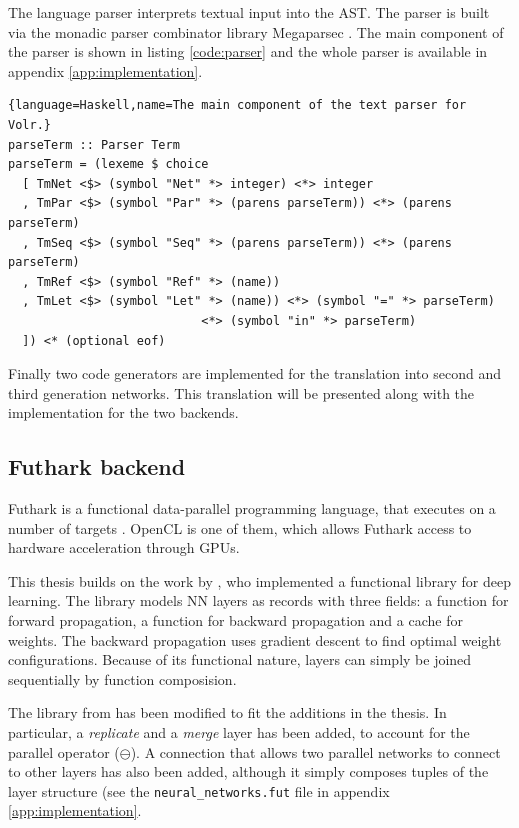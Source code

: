The language parser interprets textual input into the AST. 
The parser is built via the monadic parser combinator library Megaparsec
\cite{megaparsec}.
The main component of the parser is shown in listing \ref{code:parser}
and the whole parser is available in appendix \ref{app:implementation}.

\begin{lstlisting}{language=Haskell,name=The main component of the text parser for Volr.}
parseTerm :: Parser Term
parseTerm = (lexeme $ choice
  [ TmNet <$> (symbol "Net" *> integer) <*> integer
  , TmPar <$> (symbol "Par" *> (parens parseTerm)) <*> (parens parseTerm)
  , TmSeq <$> (symbol "Seq" *> (parens parseTerm)) <*> (parens parseTerm)
  , TmRef <$> (symbol "Ref" *> (name))
  , TmLet <$> (symbol "Let" *> (name)) <*> (symbol "=" *> parseTerm)
                           <*> (symbol "in" *> parseTerm)
  ]) <* (optional eof)
\end{lstlisting} \label{code:parser}

Finally two code generators are implemented for the translation into
second and third generation networks.
This translation will be presented along with the implementation
for the two backends.

\subsection{Futhark backend} \label{sec:volr-futhark}
Futhark is a functional data-parallel programming language, that
executes on a number of targets \autocite{Henriksen2017}.
\gls{OpenCL} is one of them, which allows Futhark access to 
hardware acceleration through \gls{GPU}s.

This thesis builds on the work by \textcite{Minh2018}, who 
implemented a functional library for deep learning.
The library models \gls{NN} layers as records with three fields:
a function for forward propagation, a function for backward propagation
and a cache for weights. 
The backward propagation uses gradient descent to find optimal
weight configurations.
Because of its functional nature, layers can simply be joined 
sequentially by function composision.

The library from \cite{Minh2018} has been modified to fit the
additions in the thesis.
In particular, a \textit{replicate} and a \textit{merge} layer has
been added, to account for the parallel operator ($\ominus$).
A connection that allows two parallel networks to connect to other
layers has also been added, although it simply composes tuples of
the layer structure (see the \texttt{neural\_networks.fut} file in
appendix \ref{app:implementation}.

